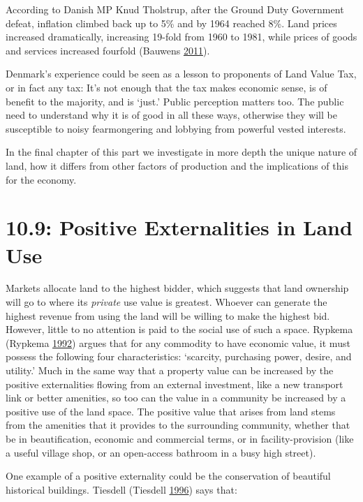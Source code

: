\documentclass[]{tufte-handout}
\begin{document}
According to Danish MP Knud Tholstrup, after the Ground Duty Government
defeat, inflation climbed back up to 5\% and by 1964 reached 8\%. Land
prices increased dramatically, increasing 19-fold from 1960 to 1981,
while prices of goods and services increased fourfold (Bauwens
\protect\hyperlink{ref-Bauwens2011}{2011}).

Denmark's experience could be seen as a lesson to proponents of Land
Value Tax, or in fact any tax: It's not enough that the tax makes
economic sense, is of benefit to the majority, and is `just.' Public
perception matters too. The public need to understand why it is of good
in all these ways, otherwise they will be susceptible to noisy
fearmongering and lobbying from powerful vested interests.

In the final chapter of this part we investigate in more depth the
unique nature of land, how it differs from other factors of production
and the implications of this for the economy.

\hypertarget{positive-externalities-in-land-use}{%
\section{10.9: Positive Externalities in Land
Use}\label{positive-externalities-in-land-use}}

Markets allocate land to the highest bidder, which suggests that land
ownership will go to where its \emph{private} use value is greatest.
Whoever can generate the highest revenue from using the land will be
willing to make the highest bid. However, little to no attention is paid
to the social use of such a space. Rypkema (Rypkema
\protect\hyperlink{ref-Rypkema1992a}{1992}) argues that for any
commodity to have economic value, it must possess the following four
characteristics: `scarcity, purchasing power, desire, and utility.' Much
in the same way that a property value can be increased by the positive
externalities flowing from an external investment, like a new transport
link or better amenities, so too can the value in a community be
increased by a positive use of the land space. The positive value that
arises from land stems from the amenities that it provides to the
surrounding community, whether that be in beautification, economic and
commercial terms, or in facility-provision (like a useful village shop,
or an open-access bathroom in a busy high street).

One example of a positive externality could be the conservation of
beautiful historical buildings. Tiesdell (Tiesdell
\protect\hyperlink{ref-tiesdell1996}{1996}) says that:
\end{document}
